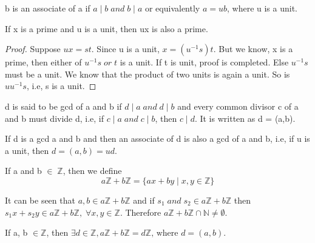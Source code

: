 \documentclass[10pt,a4paper]{article}
\begin{document}
\begin{definition}[Associate]
b is an associate of a if $a\mid b \; and \; b\mid a$ or equivalently $a = ub$, where u is a unit.
\end{definition}

\begin{theorem}
If x is a prime and u is a unit, then ux is also a prime.
\end{theorem}

\begin{proof}
Suppose $ux=st$. Since u is a unit, $x=(u^{-1}s)t$. But we know, x is a prime, then either of $u^{-1}s \; or \; t$ is a unit. If t is unit, proof is completed. Else $u^{-1}s$ must be a unit. We know that the product of two units is again a unit. So is $uu^{-1}s$, i.e, s is a unit.
\end{proof}

\begin{definition}
d is said to be gcd of a and b if $d\mid a\;and\;d\mid b$ and every common divisor c of a and b must divide d, i.e, if $c\mid a\;and\;c\mid b$, then $c\mid d$. It is written as d = (a,b).
\end{definition}

\begin{remark}
If d is a gcd a and b and then an associate of d is also a gcd of a and b, i.e, if u is a unit, then $d = (a,b) = ud$.
\end{remark}

\begin{definition}
If a and b $\in\; \mathbb{Z}$, then we define $$a\mathbb{Z}+b\mathbb{Z} = \{ax+by\mid x, y\in\mathbb{Z}\}$$
\end{definition}

\begin{remark}
It can be seen that $a,b \in a\mathbb{Z}+b\mathbb{Z}$ and if $s_{1} \;and\; s_{2} \in a\mathbb{Z}+b\mathbb{Z}$ then $s_{1}x+s_{2}y \in a\mathbb{Z}+b\mathbb{Z},\; \forall x,y \in\mathbb{Z}$. Therefore $a\mathbb{Z}+b\mathbb{Z} \cap \mathbb{N} \neq \emptyset$.
\end{remark}

\begin{theorem}
If a, b $\in \mathbb{Z}$, then $\exists d \in \mathbb{Z}, a\mathbb{Z}+b\mathbb{Z} = d\mathbb{Z}\text{, where }d = (a,b).$
\end{theorem}
\end{document}
